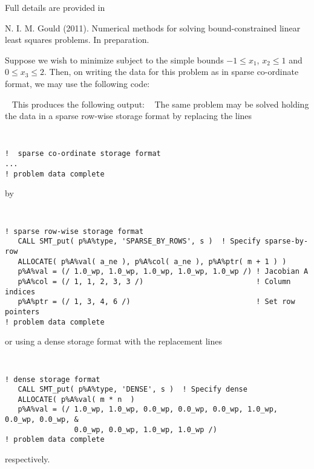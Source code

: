\documentclass{galahad}
\begin{document}
\noindent
Full details are provided in
\vspace*{1mm}

\noindent
N. I. M. Gould (2011).
Numerical methods for solving bound-constrained
linear least squares problems.
In preparation.


\galexample
Suppose we wish to minimize
subject to the simple bounds
$-1  \leq  x_{1}$,
$x_{2} \leq 1$
and $0 \leq x_{3}  \leq  2$.
Then, on writing the data for this problem as
in sparse co-ordinate format, we may use the following code:

{\tt \small
\VerbatimInput{\packageexample}
}
\noindent
This produces the following output: \vspace*{-2mm}
{\tt \small
\VerbatimInput{\packageresults}
}
\noindent
The same problem may be solved holding the data in
a sparse row-wise storage format by replacing the lines
{\tt \small
\begin{verbatim}
!  sparse co-ordinate storage format
...
! problem data complete
\end{verbatim}
}
\noindent
by
{\tt \small
\begin{verbatim}
! sparse row-wise storage format
   CALL SMT_put( p%A%type, 'SPARSE_BY_ROWS', s )  ! Specify sparse-by-row
   ALLOCATE( p%A%val( a_ne ), p%A%col( a_ne ), p%A%ptr( m + 1 ) )
   p%A%val = (/ 1.0_wp, 1.0_wp, 1.0_wp, 1.0_wp, 1.0_wp /) ! Jacobian A
   p%A%col = (/ 1, 1, 2, 3, 3 /)                          ! Column indices
   p%A%ptr = (/ 1, 3, 4, 6 /)                             ! Set row pointers
! problem data complete
\end{verbatim}
}
\noindent
or using a dense storage format with the replacement lines
{\tt \small
\begin{verbatim}
! dense storage format
   CALL SMT_put( p%A%type, 'DENSE', s )  ! Specify dense
   ALLOCATE( p%A%val( m * n  )
   p%A%val = (/ 1.0_wp, 1.0_wp, 0.0_wp, 0.0_wp, 0.0_wp, 1.0_wp, 0.0_wp, 0.0_wp, &
                0.0_wp, 0.0_wp, 1.0_wp, 1.0_wp /)
! problem data complete
\end{verbatim}
}
\noindent
respectively.
\end{document}
